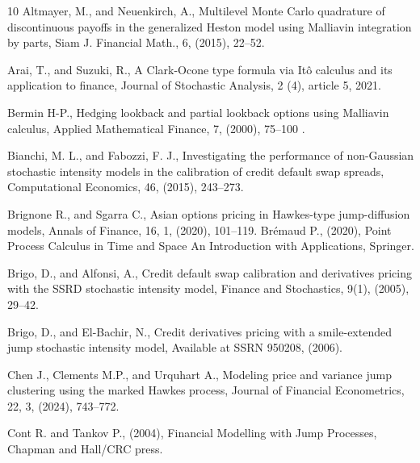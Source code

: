 \documentclass[11pt]{article}
\numberwithin{equation}{section}
\begin{document}

\begin{thebibliography}{10}
Altmayer, M., and Neuenkirch, A., Multilevel Monte Carlo quadrature of discontinuous payoffs in the generalized Heston model using Malliavin integration by parts, Siam J. Financial Math., 6, (2015), 22--52.

 Arai, T., and Suzuki, R., A Clark-Ocone type formula via It\^{o} calculus and its application to finance, Journal of Stochastic Analysis, 2 (4), article 5, 2021.

 Bermin H-P., Hedging lookback and partial lookback options
using Malliavin calculus, Applied Mathematical Finance, 7, (2000),  75–100 . 

Bianchi, M. L., and Fabozzi, F. J.,
Investigating the performance of non-Gaussian stochastic intensity models in the calibration of credit default swap spreads,
Computational Economics, 46, (2015), 243--273.

{Brignone R., and  Sgarra C.},
{Asian options pricing in Hawkes-type jump-diffusion models}, {Annals of Finance}, {16}, {1}, {(2020)}, {101--119}.
  Brémaud P., (2020), Point Process Calculus in Time and Space
An Introduction with Applications, Springer.

Brigo, D., and Alfonsi, A.,  
Credit default swap calibration and derivatives pricing with the SSRD stochastic intensity model, Finance and Stochastics, 9(1), (2005), 29--42.

 Brigo, D., and  El-Bachir, N.,
Credit derivatives pricing with a smile-extended jump stochastic intensity model,
Available at SSRN 950208, (2006).

{ Chen J.,  Clements M.P., and Urquhart A.},
{ Modeling price and variance jump clustering using the marked Hawkes process},
{Journal of Financial Econometrics}, {22}, {3}, {(2024)}, {743--772}.

 Cont R. and Tankov P., (2004), Financial Modelling with Jump Processes, Chapman and Hall/CRC press. 
 

\end{thebibliography}
\end{document}
